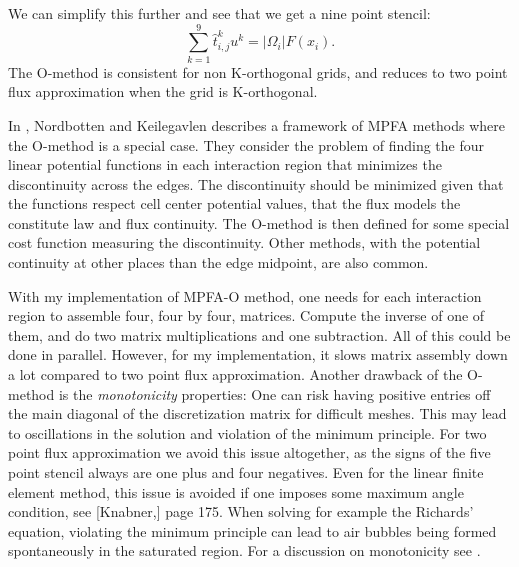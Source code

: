 \documentclass[../Main/main.tex]{subfiles}
\begin{document}
	We can simplify this further and see that we get a nine point stencil:
	\begin{equation*}
		\sum_{k=1}^9 \hat{t}^{k}_{i,j}u^k = |\Omega_i|F(x_i).
	\end{equation*}
	The O-method is consistent for non K-orthogonal grids, and reduces to two point flux approximation when the grid is K-orthogonal.
	\par
	In \cite{nordbotten2020introduction}, Nordbotten and Keilegavlen describes a framework of MPFA methods where the O-method is a special case. They consider the problem of finding the four linear potential functions in each interaction region that minimizes the discontinuity across the edges. The discontinuity should be minimized given that the functions respect cell center potential values, that the flux models the constitute law and flux continuity. The O-method is then defined for some special cost function measuring the discontinuity. Other methods, with the potential continuity at other places than the edge midpoint, are also common.
	\par 
	With my implementation of MPFA-O method, one needs for each interaction region to assemble four, four by four, matrices. Compute the inverse of one of them, and do two matrix multiplications and one subtraction. All of this could be done in parallel. However, for my implementation, it slows matrix assembly down a lot compared to two point flux approximation. Another drawback of the O-method is the \emph{monotonicity} properties: One can risk having positive entries off the main diagonal of the discretization matrix for difficult meshes. This may lead to oscillations in the solution and violation of the minimum principle. For two point flux approximation we avoid this issue altogether, as the signs of the five point stencil always are one plus and four negatives. Even for the linear finite element method, this issue is avoided if one imposes some maximum angle condition, see [Knabner,\cite{Knabner}] page 175. When solving for example the Richards' equation, violating the minimum principle can lead to air bubbles being formed spontaneously in the saturated region. For a discussion on monotonicity see \cite{10.1007/s00211-006-0060-z}.
\end{document}
